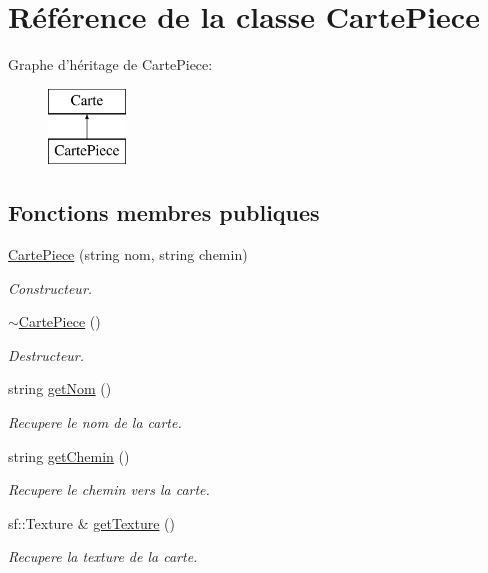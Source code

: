 \hypertarget{classCartePiece}{\section{\-Référence de la classe \-Carte\-Piece}
\label{classCartePiece}
}
\-Graphe d'héritage de \-Carte\-Piece\-:\begin{figure}[H]
\begin{center}
\leavevmode
\includegraphics[height=2.000000cm]{classCartePiece}
\end{center}
\end{figure}
\subsection*{\-Fonctions membres publiques}
\begin{DoxyCompactItemize}
\item 
\hypertarget{classCartePiece_ad4adcc0b42ee2132149a2f0cd6323c01}{\hyperlink{classCartePiece_ad4adcc0b42ee2132149a2f0cd6323c01}{\-Carte\-Piece} (string nom, string chemin)}\label{classCartePiece_ad4adcc0b42ee2132149a2f0cd6323c01}

\begin{DoxyCompactList}\small\item\em \-Constructeur. \end{DoxyCompactList}\item 
\hypertarget{classCartePiece_af914e67e452ed4668699e70fed642b1d}{\hyperlink{classCartePiece_af914e67e452ed4668699e70fed642b1d}{$\sim$\-Carte\-Piece} ()}\label{classCartePiece_af914e67e452ed4668699e70fed642b1d}

\begin{DoxyCompactList}\small\item\em \-Destructeur. \end{DoxyCompactList}\item 
string \hyperlink{classCartePiece_ac3664a8a367a1d84c8334662a970b2d1}{get\-Nom} ()
\begin{DoxyCompactList}\small\item\em \-Recupere le nom de la carte. \end{DoxyCompactList}\item 
string \hyperlink{classCartePiece_aecc861b0aa5cadeb453c0eae266fca37}{get\-Chemin} ()
\begin{DoxyCompactList}\small\item\em \-Recupere le chemin vers la carte. \end{DoxyCompactList}\item 
sf\-::\-Texture \& \hyperlink{classCartePiece_ab3c9961822338a255a764b9247989e93}{get\-Texture} ()
\begin{DoxyCompactList}\small\item\em \-Recupere la texture de la carte. \end{DoxyCompactList}\end{DoxyCompactItemize}


